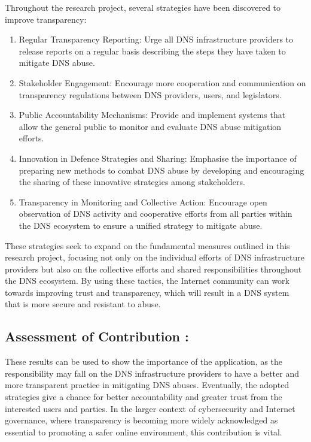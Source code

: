 Throughout the research project, several strategies have been discovered to improve transparency:


\begin{enumerate}

    \item Regular Transparency Reporting: Urge all DNS infrastructure providers to release reports on a regular basis describing the steps they have taken to mitigate DNS abuse.

    \item Stakeholder Engagement: Encourage more cooperation and communication on transparency regulations between DNS providers, users, and legislators.

    \item Public Accountability Mechanisms: Provide and implement systems that allow the general public to monitor and evaluate DNS abuse mitigation efforts.
    
    \item Innovation in Defence Strategies and Sharing: Emphasise the importance of preparing new methods to combat DNS abuse by developing and encouraging the sharing of these innovative strategies among stakeholders.
    
    \item Transparency in Monitoring and Collective Action: Encourage open observation of DNS activity and cooperative efforts from all parties within the DNS ecosystem to ensure a unified strategy to mitigate abuse.
    
\end{enumerate}

These strategies seek to expand on the fundamental measures outlined in this research project, focusing not only on the individual efforts of DNS infrastructure providers but also on the collective efforts and shared responsibilities throughout the DNS ecosystem. By using these tactics, the Internet community can work towards improving trust and transparency, which will result in a DNS system that is more secure and resistant to abuse.


\subsection{Assessment of Contribution :}

These results can be used to show the importance of the application, as the responsibility may fall on the DNS infrastructure providers to have a better and more transparent practice in mitigating DNS abuses. Eventually, the adopted strategies give a chance for better accountability and greater trust from the interested users and parties. In the larger context of cybersecurity and Internet governance, where transparency is becoming more widely acknowledged as essential to promoting a safer online environment, this contribution is vital.


